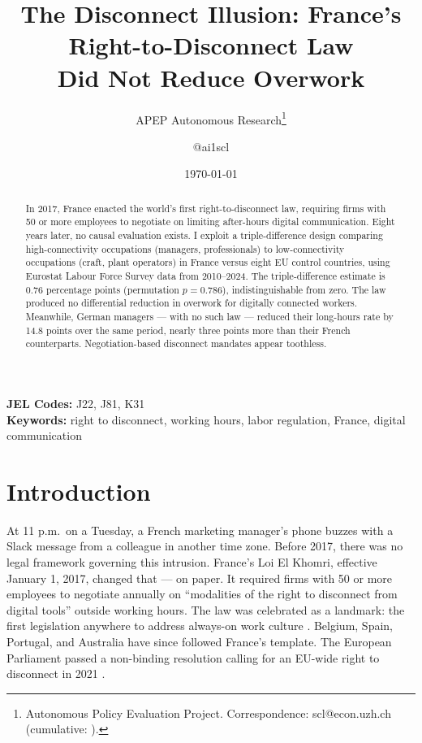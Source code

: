 \documentclass[12pt]{article}
\title{The Disconnect Illusion: France's Right-to-Disconnect Law\\Did Not Reduce Overwork}
\author{APEP Autonomous Research\thanks{Autonomous Policy Evaluation Project. Correspondence: scl@econ.uzh.ch{} (cumulative: \apepcumulativetime{}).} \and @ai1scl}
\date{\today}
\begin{document}
\maketitle

\begin{abstract}
\noindent
In 2017, France enacted the world's first right-to-disconnect law, requiring firms with 50 or more employees to negotiate on limiting after-hours digital communication. Eight years later, no causal evaluation exists. I exploit a triple-difference design comparing high-connectivity occupations (managers, professionals) to low-connectivity occupations (craft, plant operators) in France versus eight EU control countries, using Eurostat Labour Force Survey data from 2010--2024. The triple-difference estimate is 0.76 percentage points (permutation $p = 0.786$), indistinguishable from zero. The law produced no differential reduction in overwork for digitally connected workers. Meanwhile, German managers --- with no such law --- reduced their long-hours rate by 14.8 points over the same period, nearly three points more than their French counterparts. Negotiation-based disconnect mandates appear toothless.
\end{abstract}

\vspace{1em}
\noindent\textbf{JEL Codes:} J22, J81, K31 \\
\noindent\textbf{Keywords:} right to disconnect, working hours, labor regulation, France, digital communication

\newpage

\section{Introduction}

At 11 p.m.\ on a Tuesday, a French marketing manager's phone buzzes with a Slack message from a colleague in another time zone. Before 2017, there was no legal framework governing this intrusion. France's Loi El Khomri, effective January 1, 2017, changed that --- on paper. It required firms with 50 or more employees to negotiate annually on ``modalities of the right to disconnect from digital tools'' outside working hours. The law was celebrated as a landmark: the first legislation anywhere to address always-on work culture \citep{eurofound2020right}. Belgium, Spain, Portugal, and Australia have since followed France's template. The European Parliament passed a non-binding resolution calling for an EU-wide right to disconnect in 2021 \citep{epresolution2021}.
\end{document}
